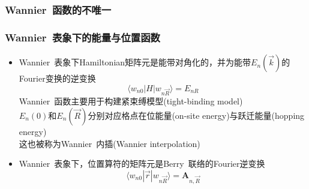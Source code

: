 {\frame
{
	\frametitle{\textrm{Wannier~}函数的不唯一}
\begin{figure}[h!]
\centering
\hspace*{-0.35in}
\label{Non-local Wannier-function}
\end{figure}
}

\frame
{
	\frametitle{\textrm{Wannier~}表象下的能量与位置函数}
	\begin{itemize}
		\item \textrm{Wannier~}表象下\textrm{Hamiltonian}矩阵元是能带对角化的，并为能带$E_n(\vec k)$的\textrm{Fourier}变换的逆变换
			\begin{displaymath}
				\langle w_{n0}|H|w_{n\vec R}\rangle=E_{nR}
			\end{displaymath}
			\textrm{Wannier~}函数主要用于构建紧束缚模型\textrm{(tight-binding model)}\\
			$E_n(0)$和$E_n(\vec R)$分别对应格点在位能量\textrm{(on-site energy)}与跃迁能量\textrm{(hopping energy)}\\
			这也被称为\textrm{Wannier~}内插\textrm{(Wannier interpolation)}
		\item \textrm{Wannier~}表象下，位置算符的矩阵元是\textrm{Berry~}联络的\textrm{Fourier}逆变换
			\begin{displaymath}
				\langle w_{n0}|\vec r|w_{n\vec R}\rangle=\mathbf{A}_{n,\vec R}
			\end{displaymath}
	\end{itemize}
}

}
